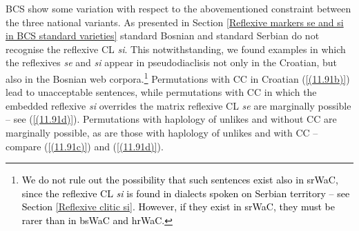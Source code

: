 %

\noindent BCS show some variation with respect to the abovementioned constraint between the three national variants. As presented in Section \ref{Reflexive markers se and si in BCS standard varieties} standard Bosnian and standard Serbian do not recognise the reflexive CL \textit{si}. This notwithstanding, we found examples in which the reflexives \textit{se} and \textit{si} appear in pseudodiaclisis not only in the Croatian, but also in the Bosnian web corpora.\footnote{\textcolor{black}{We do not rule out the possibility that such sentences exist also in srWaC, since the reflexive CL \textit{si} is found in dialects spoken on Serbian territory – see Section \ref{Reflexive clitic si}. However, if they exist in srWaC, they must be rarer than in bsWaC and hrWaC.}} Permutations with CC in Croatian (\ref{(11.91b)}) lead to unacceptable sentences, while permutations with CC in which the embedded reflexive \textit{si} overrides the matrix reflexive CL \textit{se} are marginally possible – see (\ref{(11.91d)}). Permutations with haplology of unlikes and without CC are marginally possible, as are those with haplology of unlikes and with CC – compare (\ref{(11.91c)}) and (\ref{(11.91d)}). 

